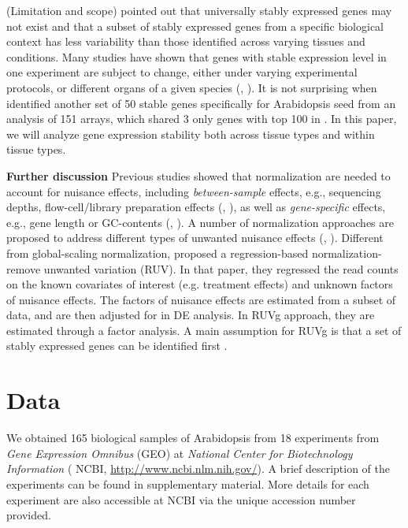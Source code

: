 \documentclass[11pt, a4paper]{article}
\begin{document}
(Limitation and scope) \cite{hruz2011refgenes} pointed out that universally
stably expressed genes may not exist and that a subset of stably expressed
genes from a specific biological context has less variability than those
identified across varying tissues and conditions. Many studies have shown that
genes with stable expression level  in one experiment are subject to change,
either under varying experimental protocols, or different organs of a given
species (\cite{reid2006optimized}, \cite{hong2010identification}).  It is not
surprising when \cite{dekkers2012identification} identified another set of 50
stable genes specifically for Arabidopsis seed from an analysis of 151 arrays,
which shared 3 only genes with top 100 in \cite{czechowski2005genome}.  In
this paper, we will analyze gene expression stability both across tissue types
and within tissue types.


{\bf Further discussion} Previous studies showed that normalization are needed
to account for nuisance effects, including \textit{between-sample} effects,
e.g., sequencing depths, flow-cell/library preparation effects
(\cite{bullard2010evaluation}, \cite{robinson2010scaling}), as well as
\textit{gene-specific} effects, e.g.,  gene length or GC-contents
(\cite{risso2011gc}, \cite{hansen2012removing}). A number of normalization
approaches are proposed to address different types of unwanted nuisance
effects (\cite{dillies2013comprehensive}, \cite{risso2014nat}). Different from
global-scaling normalization, \cite{risso2014nat}  proposed a regression-based
normalization-remove unwanted variation (RUV).  In that paper, they regressed
the read counts on the known covariates of interest (e.g. treatment effects)
and unknown factors of nuisance effects. The factors of nuisance effects are
estimated from a subset of data, and are then adjusted for in DE analysis. In
RUVg approach, they are estimated through a factor analysis. A main assumption
for RUVg is that a set of stably expressed genes can be identified first
.

\section{Data}
 We obtained 165 biological samples of Arabidopsis  from 18 experiments from \textit{Gene Expression Omnibus} (GEO) at \textit{National Center for Biotechnology Information}  ( NCBI, \url{http://www.ncbi.nlm.nih.gov/}).  A brief description of the experiments can be found in supplementary material. More details for each experiment are also accessible at NCBI via the unique accession number provided.
 
\end{document}
